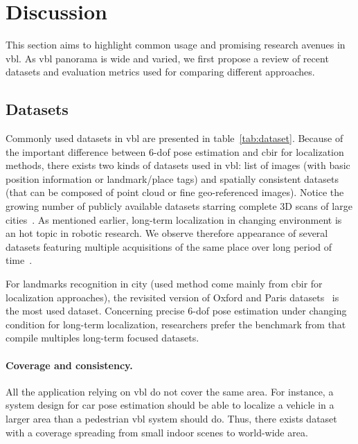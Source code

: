 \section{Discussion}
\label{sec:comparison}
	This section aims to highlight common usage and promising research avenues in \ac{vbl}. As \ac{vbl} panorama is wide and varied, we first propose a review of recent datasets and evaluation metrics used for comparing different approaches.
	
	\subsection{Datasets}
		Commonly used datasets in \ac{vbl} are presented in table~\ref{tab:dataset}. Because of the important difference between 6-\ac{dof} pose estimation and \ac{cbir} for localization methods, there exists two kinds of datasets used in \ac{vbl}: list of images (with basic position information or landmark/place tags) and spatially consistent datasets (that can be composed of point cloud or fine geo-referenced images). Notice the growing number of publicly available datasets starring complete 3D scans of large cities~\citep{Menze2015,Maddern2016,Wang2016}. As mentioned earlier, long-term localization in changing environment is an hot topic in robotic research. We observe therefore appearance of several datasets featuring multiple acquisitions of the same place over long period of time~\citep{Maddern2016,Carlevaris-Bianco2016,Krajnik2010,Krajnik2014}.
		
		For landmarks recognition in city (used method come mainly from \ac{cbir} for localization approaches), the revisited version of Oxford and Paris datasets~\citep{Radenovic2018} is the most used dataset. Concerning precise 6-\ac{dof} pose estimation under changing condition for long-term localization, researchers prefer the benchmark from \citet{Sattler2018} that compile multiples long-term focused datasets.
		
		\paragraph{Coverage and consistency.}
		\label{para:coverage_consistency}
		All the application relying on \ac{vbl} do not cover the same area. For instance, a system design for car pose estimation should be able to localize a vehicle in a larger area than a pedestrian \ac{vbl} system should do. Thus, there exists dataset with a coverage spreading from small indoor scenes to world-wide area.
	
